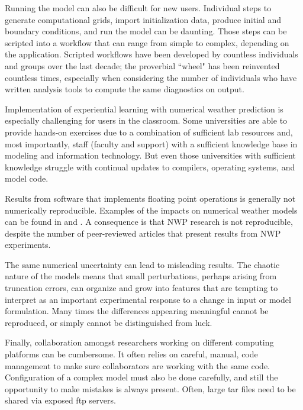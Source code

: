 \documentclass[final]{ametsoc}
\begin{document}
Running the model can also be difficult for new users.  Individual steps to generate computational grids, import initialization data, produce initial and boundary conditions, and run the model can be daunting.  Those steps can be scripted into a workflow that can range from simple to complex, depending on the application.  Scripted workflows have been developed by countless individuals and groups over the last decade; the proverbial ``wheel" has been reinvented countless times, especially when considering the number of individuals who have written analysis tools to compute the same diagnostics on output.

Implementation of experiential learning with numerical weather prediction is especially challenging for users in the classroom.  Some universities are able to provide hands-on exercises due to a combination of sufficient lab resources and, most importantly, staff (faculty and support) with a sufficient knowledge base in modeling and information technology.  But even those universities with sufficient knowledge struggle with continual updates to compilers, operating systems, and model code.  

Results from software that implements floating point operations is generally not  numerically reproducible. Examples of the impacts on numerical weather models can be found in \citet{Thomas02} and \citet{Baker:2015}. A consequence is that NWP research is not reproducible, despite the number of peer-reviewed articles that present results from NWP experiments. 

The same numerical uncertainty can lead to misleading results. The chaotic nature of the models means that small perturbations, perhaps arising from truncation errors, can organize and grow into features that are tempting to interpret as an important experimental response to a change in input or model formulation. Many times the differences appearing meaningful cannot be reproduced, or simply cannot be distinguished from luck.

Finally, collaboration amongst researchers working on different computing platforms can be cumbersome. It often relies on careful, manual, code management to make sure collaborators are working with the same code. Configuration of a complex model must also be done carefully, and still the opportunity to make mistakes is always present. Often, large tar files need to be shared via exposed ftp servers.  
\end{document}
